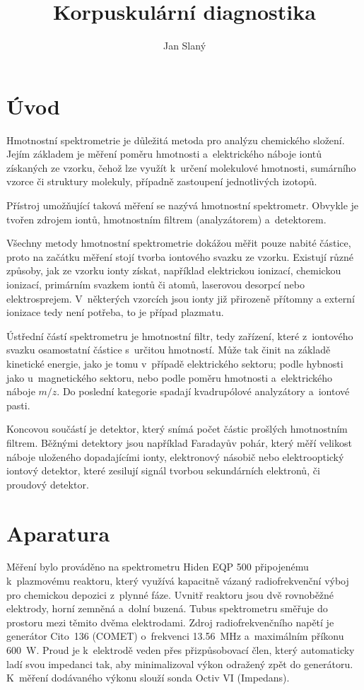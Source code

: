 \documentclass{protokol}
\title{Korpuskulární diagnostika}
\author{Jan Slaný}
\newcommand\mz{m/z}
\begin{document}
\header

\section{Úvod}
\label{sec:intro}
Hmotnostní spektrometrie je důležitá metoda pro analýzu chemického složení.
Jejím základem je měření poměru hmotnosti a~elektrického náboje iontů
získaných ze vzorku, čehož lze využít k~určení molekulové hmotnosti,
sumárního vzorce či struktury molekuly,
případně zastoupení jednotlivých izotopů.

Přístroj umožňující taková měření se nazývá hmotnostní spektrometr.
Obvykle je tvořen zdrojem iontů, hmotnostním filtrem (analyzátorem)
a~detektorem.

Všechny metody hmotnostní spektrometrie dokážou měřit pouze nabité částice,
proto na začátku měření stojí tvorba iontového svazku ze vzorku.
Existují různé způsoby, jak ze vzorku ionty získat, například
elektrickou ionizací, chemickou ionizací, primárním svazkem iontů či atomů,
laserovou desorpcí nebo elektrosprejem.
V~některých vzorcích jsou ionty již přirozeně přítomny a externí ionizace
tedy není potřeba, to je případ plazmatu.

Ústřední částí spektrometru je hmotnostní filtr, tedy zařízení,
které z~iontového svazku osamostatní částice s~určitou hmotností.
Může tak činit na základě kinetické energie, jako je tomu v~případě
elektrického sektoru; podle hybnosti jako u~magnetického sektoru,
nebo podle poměru hmotnosti a~elektrického náboje $\mz$.
Do poslední kategorie spadají kvadrupólové analyzátory a~iontové pasti.

Koncovou součástí je detektor, který snímá počet částic prošlých hmotnostním
filtrem.
Běžnými detektory jsou například Faradayův pohár,
který měří velikost náboje uloženého dopadajícími ionty,
elektronový násobič nebo elektrooptický iontový detektor,
které zesilují signál tvorbou sekundárních elektronů,
či proudový detektor.

\section{Aparatura}
\label{sec:setup}
Měření bylo prováděno na spektrometru Hiden EQP 500 připojenému k~plazmovému
reaktoru, který využívá kapacitně vázaný radiofrekvenční výboj pro chemickou
depozici z~plynné fáze.
Uvnitř reaktoru jsou dvě rovnoběžné elektrody, horní zemněná a~dolní buzená.
Tubus spektrometru směřuje do prostoru mezi těmito dvěma elektrodami.
Zdroj radiofrekvenčního napětí je generátor Cito~136 (COMET) o~frekvenci
\SI{13.56}{\mega\hertz} a~maximálním příkonu \SI{600}{\watt}.
Proud je k~elektrodě veden přes přizpůsobovací člen, který automaticky
ladí svou impedanci tak, aby minimalizoval výkon odražený zpět do generátoru.
K~měření dodávaného výkonu slouží sonda Octiv VI (Impedans).
\end{document}
